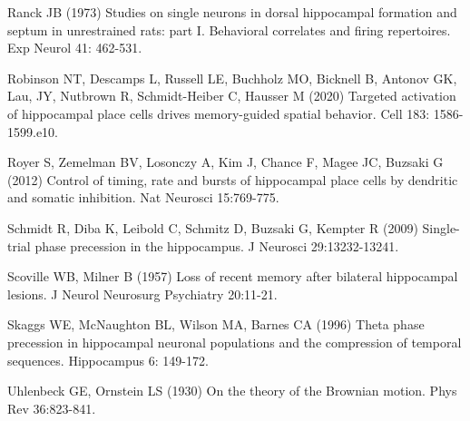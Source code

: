 \documentclass[12pt, letterpaper]{article}
\newenvironment{collapsable}{}{}
\begin{document}
\begin{collapsable}
  \vspace{12pt}

  \noindent Ranck JB (1973) Studies on single neurons in dorsal hippocampal formation
  and septum in unrestrained rats: part I. Behavioral correlates and firing
  repertoires. Exp Neurol 41: 462-531.

  \vspace{12pt}

  \noindent Robinson NT, Descamps L, Russell LE, Buchholz MO, Bicknell B, Antonov GK,
  Lau, JY, Nutbrown R, Schmidt-Heiber C, Hausser M (2020) Targeted activation
  of hippocampal place cells drives memory-guided spatial behavior. Cell 183:
  1586-1599.e10.

  \vspace{12pt}

  \noindent Royer S, Zemelman BV, Losonczy A, Kim J, Chance F, Magee JC, Buzsaki G
  (2012) Control of timing, rate and bursts of hippocampal place cells by
  dendritic and somatic inhibition. Nat Neurosci 15:769-775.

  \vspace{12pt}

  \noindent Schmidt R, Diba K, Leibold C, Schmitz D, Buzsaki G, Kempter R (2009)
  Single-trial phase precession in the hippocampus. J Neurosci 29:13232-13241.

  \vspace{12pt}
  \noindent Scoville WB, Milner B (1957) Loss of recent memory after bilateral
  hippocampal lesions. J Neurol Neurosurg Psychiatry 20:11-21.

  \vspace{12pt}

  \noindent Skaggs WE, McNaughton BL, Wilson MA, Barnes CA (1996) Theta phase precession
  in hippocampal neuronal populations and the compression of temporal
  sequences. Hippocampus 6: 149-172.

  \vspace{12pt}

  \noindent Uhlenbeck GE, Ornstein LS (1930) On the theory of the Brownian motion. Phys
  Rev 36:823-841.
\end{collapsable}
\end{document}
